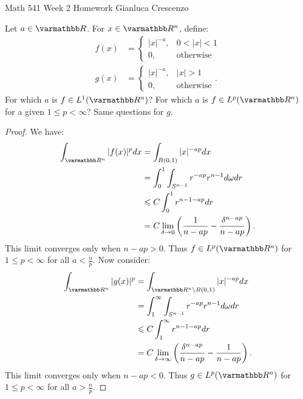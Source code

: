 \documentclass[10pt,oneside,openany]{memoir}
\begin{document}
\homeworktitle
{Math 541} %
{Week 2 Homework} %
{Gianluca Crescenzo} %

\begin{exercise}
	Let $a \in \bfR$. For $x \in \bfR^n$, define:
	\begin{align*}
		f(x) &= \begin{cases}
			|x|^{-a}, & 0 < |x| < 1 \\
			0, & \text{otherwise}
		\end{cases} \\
		g(x) &= \begin{cases}
			|x|^{-a}, & |x| > 1 \\
			0, & \text{otherwise}
		\end{cases}.
	\end{align*}
	For which $a$ is $f \in L^1(\bfR^n)$? For which $a$ is $f \in L^p(\bfR^n)$ for a given $1 \leq p < \infty$? Same questions for $g$.
\end{exercise}
	\begin{proof}
		We have:
		\begin{align*}
			\int_{\bfR^n}^{} |f(x)|^p dx
			& = \int_{B(0,1)}^{} |x|^{-ap}dx \\
			& = \int_{0}^{1} \int_{S^{n-1}}^{} r^{-ap}r^{n-1}d \omega dr \\
			& \leq C \int_{0}^{1} r^{n-1-ap}dr \\
			& = C \lim_{\delta \rightarrow 0} \left( \frac{1}{n-ap} - \frac{\delta^{n-ap}}{n-ap} \right).  
		\end{align*}
		This limit converges only when $n-ap > 0$. Thus $f \in L^p(\bfR^n)$ for $1 \leq p < \infty$ for all $a < \frac{n}{p}$. Now consider:
		\begin{align*}
			\int_{\bfR^n}^{} |g(x)|^p 
			& = \int_{\bfR^n \setminus B(0,1)}^{}|x|^{-ap} dx\\
			& = \int_{1}^{\infty} \int_{S^{n-1}}^{} r^{-ap}r^{n-1}d \omega dr \\
			& \leq C \int_{1}^{\infty} r^{n-1-ap}dr \\
			& = C \lim_{\delta \rightarrow \infty} \left( \frac{\delta^{n-ap}}{n-ap} - \frac{1}{n-ap}\right). 
		\end{align*}
		This limit converges only when $n-ap < 0$. Thus $g \in L^p(\bfR^n)$ for $1 \leq p < \infty$ for all $a > \frac{n}{p}$.
	\end{proof}
\end{document}
